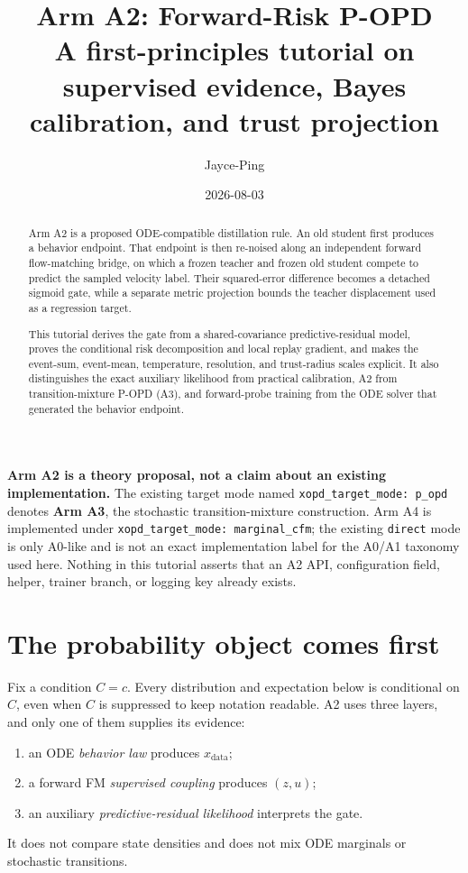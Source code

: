 \documentclass[11pt,a4paper]{article}
\title{\textbf{Arm A2: Forward-Risk P-OPD}\\[0.35em]
\large A first-principles tutorial on supervised evidence, Bayes calibration, and trust projection}
\author{Jayce-Ping}
\date{2026-08-03}
\newcommand{\data}{\mathrm{data}}
\theoremstyle{plain}
\theoremstyle{definition}
\begin{document}
\maketitle

\begin{abstract}
Arm A2 is a proposed ODE-compatible distillation rule.  An old student first produces a behavior
endpoint.  That endpoint is then re-noised along an independent forward flow-matching bridge, on
which a frozen teacher and frozen old student compete to predict the sampled velocity label.
Their squared-error difference becomes a detached sigmoid gate, while a separate metric
projection bounds the teacher displacement used as a regression target.

This tutorial derives the gate from a shared-covariance predictive-residual model, proves the
conditional risk decomposition and local replay gradient, and makes the event-sum, event-mean,
temperature, resolution, and trust-radius scales explicit.  It also distinguishes the exact
auxiliary likelihood from practical calibration, A2 from transition-mixture P-OPD (A3), and
forward-probe training from the ODE solver that generated the behavior endpoint.
\end{abstract}

\begin{tcolorbox}[colback=yellow!6,colframe=yellow!55!black,title=Status boundary]
\textbf{Arm A2 is a theory proposal, not a claim about an existing implementation.}
The existing target mode named \texttt{xopd\_target\_mode: p\_opd} denotes \textbf{Arm A3},
the stochastic transition-mixture construction.  Arm A4 is implemented under
\texttt{xopd\_target\_mode: marginal\_cfm}; the existing \texttt{direct} mode is only A0-like and
is not an exact implementation label for the A0/A1 taxonomy used here.  Nothing in this tutorial
asserts that an A2 API, configuration field, helper, trainer branch, or logging key already exists.
\end{tcolorbox}

\tableofcontents
\newpage

\section{The probability object comes first}
\label{sec:objects}

Fix a condition $C=c$.  Every distribution and expectation below is conditional on $C$, even
when $C$ is suppressed to keep notation readable.  A2 uses three layers, and only one of them
supplies its evidence:
\begin{enumerate}[leftmargin=1.6em]
\item an ODE \emph{behavior law} produces $x_{\data}$;
\item a forward FM \emph{supervised coupling} produces $(z,u)$;
\item an auxiliary \emph{predictive-residual likelihood} interprets the gate.
\end{enumerate}
It does not compare state densities and does not mix ODE marginals or stochastic transitions.
\end{document}

